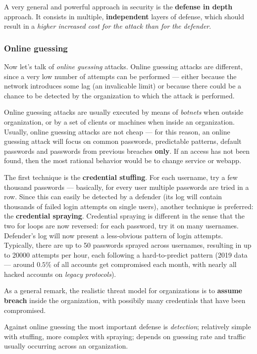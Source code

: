 \documentclass[10pt]{extreport}
\begin{document}
A very general and powerful approach in security is the \textbf{defense in
depth} approach. It consists in multiple, \textbf{independent} layers of
defense, which should result in a \emph{higher increased cost for the attack
than for the defender}.


\subsubsection{Online guessing}
Now let's talk of \emph{online guessing} attacks. Online guessing attacks are
different, since a very low number of attempts can be performed --- either
because the network introduces some lag (an invalicable limit) or because there
could be a chance to be detected by the organization to which the attack is
performed.

Online guessing attacks are usually executed by means of \emph{botnets} when
outside organization, or by a set of clients or machines when inside an
organization. Usually, online guessing attacks are not cheap --- for this
reason, an online guessing attack will focus on common passwords, predictable
patterns, default passwords and passwords from previous breaches \textbf{only}.
If an access has not been found, then the most rational behavior would be to
change service or webapp.

The first technique is the \textbf{credential stuffing}. For each username, try
a few thousand passwords --- basically, for every user multiple passwords are
tried in a row. Since this can easily be detected by a defender (its log will
contain thousands of failed login attempts on single users), another technique
is preferred: the \textbf{credential spraying}. Credential spraying is
different in the sense that the two for loops are now reversed: for each
password, try it on many usernames. Defender's log will now present a
less\--obvious pattern of login attempts. Typically, there are up to 50
passwords sprayed across usernames, resulting in up to 20000 attempts per hour,
each following a hard-to-predict pattern (2019 data --- around $0.5\%$ of all
accounts get compromised each month, with nearly all hacked accounts on
\emph{legacy protocols}).

As a general remark, the realistic threat model for organizations is to
\textbf{assume breach} inside the organization, with possibily many credentials
that have been compromised.

Against online guessing the most important defense is \emph{detection};
relatively simple with stuffing, more complex with spraying; depends on
guessing rate and traffic usually occurring across an organization.
\end{document}
